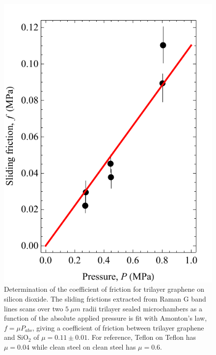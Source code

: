 \begin{figure}
\begin{center}
\includegraphics{Figs_Friction/Tri_mu.pdf}
\end{center}
\caption{\label{trimu} Determination of the coefficient of friction for trilayer graphene on silicon dioxide.  The sliding frictions extracted from Raman G band lines scans over two $5 \ \mu m$ radii trilayer sealed microchambers as a function of the absolute applied pressure is fit with Amonton's law, $f=\mu P_{abs}$, giving a coefficient of friction between trilayer graphene and $\mathrm{SiO_2}$ of $\mu=0.11 \pm 0.01$. For reference, Teflon on Teflon has $\mu=0.04$ while clean steel on clean steel has $\mu=0.6$\cite{Resnick2002}.}
\end{figure}


